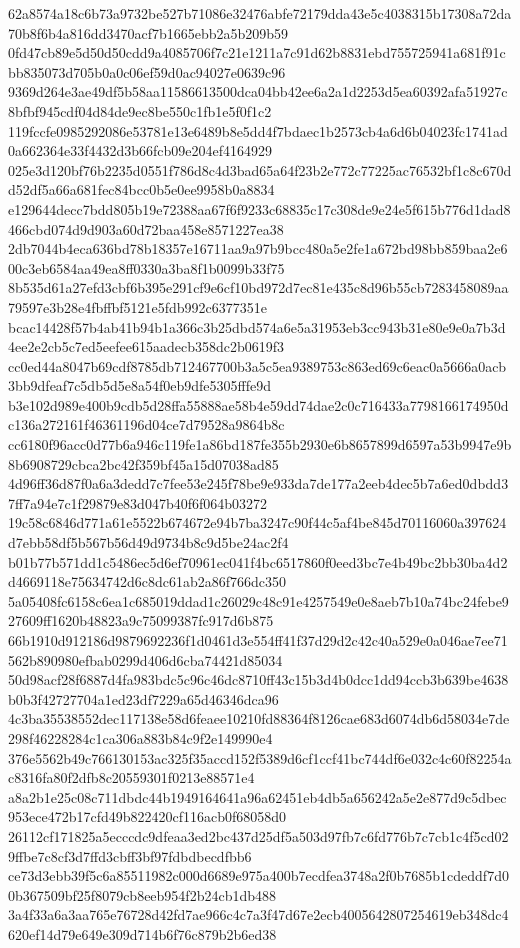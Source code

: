 \documentclass[11pt,a4paper]{article}
\begin{document}
{62a8574a18c6b73a9732be527b71086e32476abfe72179dda43e5c4038315b17308a72da70b8f6b4a816dd3470acf7b1665ebb2a5b209b59
0fd47cb89e5d50d50cdd9a4085706f7c21e1211a7c91d62b8831ebd755725941a681f91cbb835073d705b0a0c06ef59d0ac94027e0639c96
9369d264e3ae49df5b58aa11586613500dca04bb42ee6a2a1d2253d5ea60392afa51927c8bfbf945cdf04d84de9ec8be550c1fb1e5f0f1c2
119fccfe0985292086e53781e13e6489b8e5dd4f7bdaec1b2573cb4a6d6b04023fc1741ad0a662364e33f4432d3b66fcb09e204ef4164929
025e3d120bf76b2235d0551f786d8c4d3bad65a64f23b2e772c77225ac76532bf1c8c670dd52df5a66a681fec84bcc0b5e0ee9958b0a8834
e129644decc7bdd805b19e72388aa67f6f9233c68835c17c308de9e24e5f615b776d1dad8466cbd074d9d903a60d72baa458e8571227ea38
2db7044b4eca636bd78b18357e16711aa9a97b9bcc480a5e2fe1a672bd98bb859baa2e600c3eb6584aa49ea8ff0330a3ba8f1b0099b33f75
8b535d61a27efd3cbf6b395e291cf9e6cf10bd972d7ec81e435c8d96b55cb7283458089aa79597e3b28e4fbffbf5121e5fdb992c6377351e
bcac14428f57b4ab41b94b1a366c3b25dbd574a6e5a31953eb3cc943b31e80e9e0a7b3d4ee2e2cb5c7ed5eefee615aadecb358dc2b0619f3
cc0ed44a8047b69cdf8785db712467700b3a5c5ea9389753c863ed69c6eac0a5666a0acb3bb9dfeaf7c5db5d5e8a54f0eb9dfe5305fffe9d
b3e102d989e400b9cdb5d28ffa55888ae58b4e59dd74dae2c0c716433a7798166174950dc136a272161f46361196d04ce7d79528a9864b8c
cc6180f96acc0d77b6a946c119fe1a86bd187fe355b2930e6b8657899d6597a53b9947e9b8b6908729cbca2bc42f359bf45a15d07038ad85
4d96ff36d87f0a6a3dedd7c7fee53e245f78be9e933da7de177a2eeb4dec5b7a6ed0dbdd37ff7a94e7c1f29879e83d047b40f6f064b03272
19c58c6846d771a61e5522b674672e94b7ba3247c90f44c5af4be845d70116060a397624d7ebb58df5b567b56d49d9734b8c9d5be24ac2f4
b01b77b571dd1c5486ec5d6ef70961ec041f4bc6517860f0eed3bc7e4b49bc2bb30ba4d2d4669118e75634742d6c8dc61ab2a86f766dc350
5a05408fc6158c6ea1c685019ddad1c26029c48c91e4257549e0e8aeb7b10a74bc24febe927609ff1620b48823a9c75099387fc917d6b875
66b1910d912186d9879692236f1d0461d3e554ff41f37d29d2c42c40a529e0a046ae7ee71562b890980efbab0299d406d6cba74421d85034
50d98acf28f6887d4fa983bdc5c96c46dc8710ff43c15b3d4b0dcc1dd94ccb3b639be4638b0b3f42727704a1ed23df7229a65d46346dca96
4c3ba35538552dec117138e58d6feaee10210fd88364f8126cae683d6074db6d58034e7de298f46228284c1ca306a883b84c9f2e149990e4
376e5562b49c766130153ac325f35accd152f5389d6cf1ccf41bc744df6e032c4c60f82254ac8316fa80f2dfb8c20559301f0213e88571e4
a8a2b1e25c08c711dbdc44b1949164641a96a62451eb4db5a656242a5e2e877d9c5dbec953ece472b17cfd49b822420cf116acb0f68058d0
26112cf171825a5ecccdc9dfeaa3ed2bc437d25df5a503d97fb7c6fd776b7c7cb1c4f5cd029ffbe7c8cf3d7ffd3cbff3bf97fdbdbecdfbb6
ce73d3ebb39f5c6a85511982c000d6689e975a400b7ecdfea3748a2f0b7685b1cdeddf7d00b367509bf25f8079cb8eeb954f2b24cb1db488
3a4f33a6a3aa765e76728d42fd7ae966c4c7a3f47d67e2ecb4005642807254619eb348dc4620ef14d79e649e309d714b6f76c879b2b6ed38
}
\end{document}

